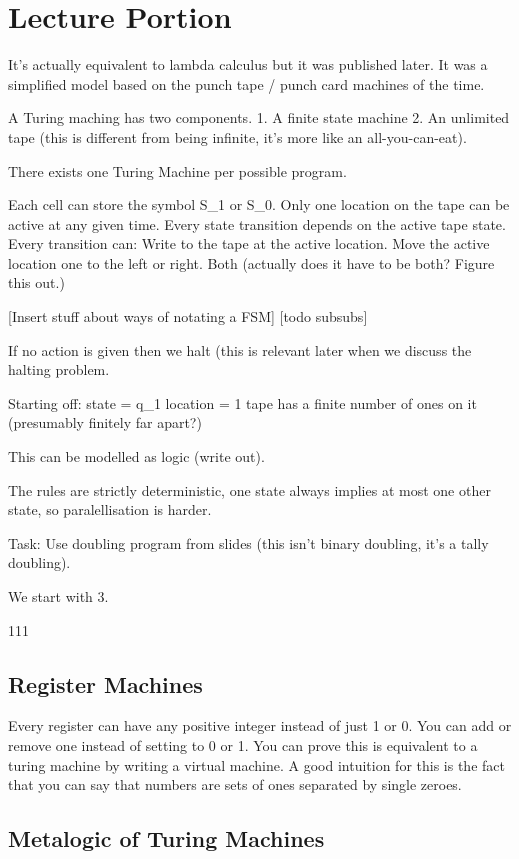 \section{Lecture Portion}
It's actually equivalent to lambda calculus but it was published later.
It was a simplified model based on the punch tape / punch card machines of the time.

A Turing maching has two components.
1. A finite state machine
2. An unlimited tape (this is different from being infinite, it's more like an all-you-can-eat).

There exists one Turing Machine per possible program.

Each cell can store the symbol S_1 or S_0.
Only one location on the tape can be active at any given time.
Every state transition depends on the active tape state.
Every transition can:
  Write to the tape at the active location.
  Move the active location one to the left or right.
  Both (actually does it have to be both? Figure this out.)

[Insert stuff about ways of notating a FSM]
[todo subsubs]

If no action is given then we halt (this is relevant later when we discuss the halting problem.

Starting off:
  state = q_1
  location = 1
  tape has a finite number of ones on it (presumably finitely far apart?)

This can be modelled as logic (write out).

The rules are strictly deterministic, one state always implies at most one other state, so paralellisation is harder.

Task:
Use doubling program from slides (this isn't binary doubling, it's a tally doubling).

We start with 3.

111

\subsection{Register Machines}
Every register can have any positive integer instead of just 1 or 0.
You can add or remove one instead of setting to 0 or 1.
You can prove this is equivalent to a turing machine by writing a virtual machine.
A good intuition for this is the fact that you can say that numbers are sets of ones separated by single zeroes.

\subsection{Metalogic of Turing Machines}
